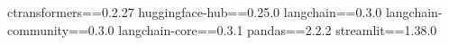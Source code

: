 ctransformers==0.2.27
huggingface-hub==0.25.0
langchain==0.3.0
langchain-community==0.3.0
langchain-core==0.3.1
pandas==2.2.2
streamlit==1.38.0

